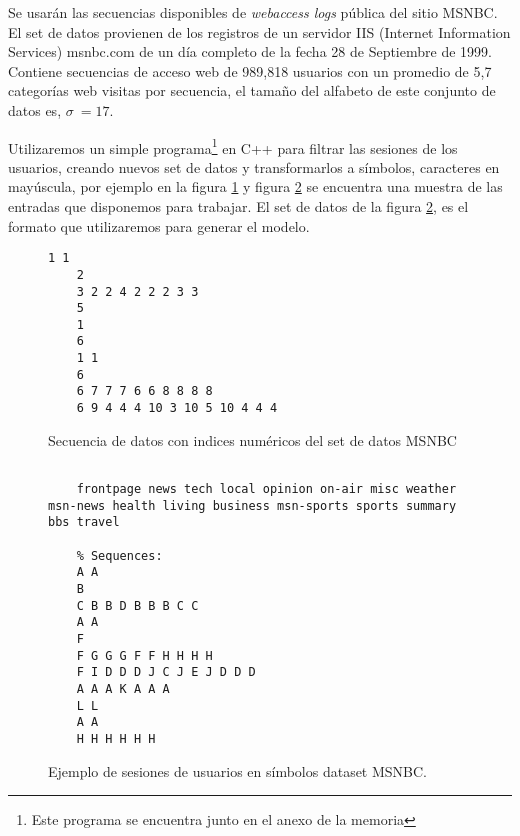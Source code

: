 
Se usarán las secuencias disponibles de \emph{webaccess logs} pública del sitio MSNBC. El set de datos provienen de los registros de un servidor {IIS} (Internet Information Services) msnbc.com de un día completo de la fecha  28 de Septiembre de 1999. 
Contiene secuencias de acceso web de 989,818 usuarios con un promedio de 5,7 categorías web visitas por secuencia, el tamaño del alfabeto de este conjunto de datos es, $\sigma \ = 17$.




Utilizaremos un simple programa\footnote{Este programa se encuentra junto en el anexo de la memoria} en {C++ }para filtrar las sesiones de los usuarios, creando nuevos set de datos y transformarlos a símbolos, caracteres en mayúscula, por ejemplo en la figura \ref{fig:sesiones-ds-msbc-num}  y figura \ref{fig:sesiones-ds-basicos} se encuentra una muestra de las entradas que disponemos para trabajar. El set de datos de la figura \ref{fig:sesiones-ds-basicos}, es el formato que utilizaremos para generar el modelo.


\begin{figure}[t]%
	\centering
	\begin{lstlisting}[frame=single,basicstyle=\ttfamily\tiny,]
	1 1 
	2 
	3 2 2 4 2 2 2 3 3 
	5 
	1 
	6 
	1 1 
	6 
	6 7 7 7 6 6 8 8 8 8 
	6 9 4 4 4 10 3 10 5 10 4 4 4 
	\end{lstlisting}	
	\caption{Secuencia de datos con indices numéricos del set de datos MSNBC}\label{fig:sesiones-ds-msbc-num}
\end{figure}




\begin{figure}[t]%
	\centering
	\begin{lstlisting}[frame=single,basicstyle=\ttfamily\tiny,]
	% Different categories found in input file:
	
	frontpage news tech local opinion on-air misc weather msn-news health living business msn-sports sports summary bbs travel
	
	% Sequences:
	A A 
	B 
	C B B D B B B C C 
	A A 
	F 
	F G G G F F H H H H 
	F I D D D J C J E J D D D 
	A A A K A A A 
	L L 
	A A 
	H H H H H H 
	\end{lstlisting}
	\caption{Ejemplo de sesiones de usuarios en símbolos dataset MSNBC.}
	\label{fig:sesiones-ds-basicos}
\end{figure}







